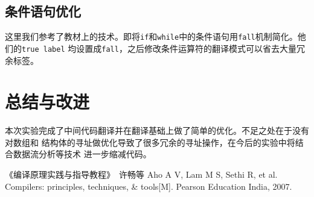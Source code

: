 \documentclass[twocolumn]{article}
\begin{document}
\subsection{条件语句优化}
这里我们参考了教材\cite{b2}上的技术。即将\verb|if|和\verb|while|中的条件语句用\verb|fall|机制简化。他们的\verb|true label|
均设置成\verb|fall|，之后修改条件运算符的翻译模式可以省去大量冗余标签。

\section{总结与改进}
本次实验完成了中间代码翻译并在翻译基础上做了简单的优化。不足之处在于没有对数组和
结构体的寻址做优化导致了很多冗余的寻址操作，在今后的实验中将结合数据流分析等技术
进一步缩减代码。

\begin{thebibliography}{00}
    《编译原理实践与指导教程》\ 许畅等
    Aho A V, Lam M S, Sethi R, et al. Compilers: principles, techniques, \& tools[M]. Pearson Education India, 2007.
\end{thebibliography}
\end{document}
